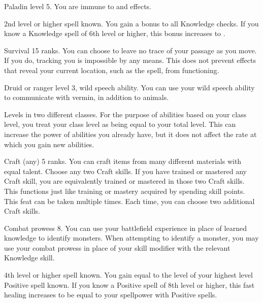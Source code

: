 \featpre Paladin level 5.
\featben You are immune to  and  effects.

\featpre 2nd level or higher  spell known.
\featben You gain a  bonus to all Knowledge checks.
If you know a Knowledge spell of 6th level or higher, this bonus increases to .

\featpre Survival 15 ranks.
\featben You can choose to leave no trace of your passage as you move.
If you do, tracking you is impossible by any means.
This does not prevent effects that reveal your current location, such as the  spell, from functioning.

\featpres Druid or ranger level 3, wild speech ability.
\featben You can use your wild speech ability to communicate with vermin, in addition to animals.

\featpre Levels in two different classes.
\featben For the purpose of abilities based on your class level, you treat your class level as being equal to your total level.
This can increase the power of abilities you already have, but it does not affect the rate at which you gain new abilities.

\featpre Craft (any) 5 ranks.
\featben You can craft items from many different materials with equal talent.
Choose any two Craft skills.
If you have trained or mastered any Craft skill, you are equivalently trained or mastered in those two Craft skills.
This functions just like training or mastery acquired by spending skill points.
 This feat can be taken multiple times.
Each time, you can choose two additional Craft skills.

\featpre Combat prowess 8.
\featben You can use your battlefield experience in place of learned knowledge to identify monsters.
When attempting to identify a monster, you may use your combat prowess in place of your skill modifier with the relevant Knowledge skill.

\featpre 4th level or higher  spell known.
\featben You gain  equal to the level of your highest level Positive spell known.
If you know a Positive spell of 8th level or higher, this fast healing increases to be equal to your spellpower with Positive spells.

